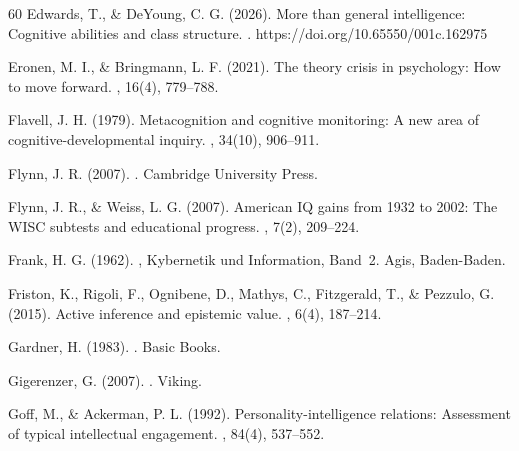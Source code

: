 \documentclass[12pt,a4paper]{article}
\begin{document}
\begin{thebibliography}{60}
Edwards, T., \& DeYoung, C. G. (2026).
\newblock More than general intelligence: Cognitive abilities and class structure.
. https://doi.org/10.65550/001c.162975

Eronen, M. I., \& Bringmann, L. F. (2021).
\newblock The theory crisis in psychology: How to move forward.
, 16(4), 779--788.

Flavell, J. H. (1979).
\newblock Metacognition and cognitive monitoring: A new area of cognitive-developmental inquiry.
, 34(10), 906--911.

Flynn, J. R. (2007).
.
\newblock Cambridge University Press.

Flynn, J. R., \& Weiss, L. G. (2007).
\newblock American IQ gains from 1932 to 2002: The WISC subtests and educational progress.
, 7(2), 209--224.

Frank, H. G. (1962).
, Kybernetik und Information, Band~2.
\newblock Agis, Baden-Baden.

Friston, K., Rigoli, F., Ognibene, D., Mathys, C., Fitzgerald, T., \& Pezzulo, G. (2015).
\newblock Active inference and epistemic value.
, 6(4), 187--214.

Gardner, H. (1983).
.
\newblock Basic Books.

Gigerenzer, G. (2007).
.
\newblock Viking.

Goff, M., \& Ackerman, P. L. (1992).
\newblock Personality-intelligence relations: Assessment of typical intellectual engagement.
, 84(4), 537--552.


\end{thebibliography}
\end{document}

